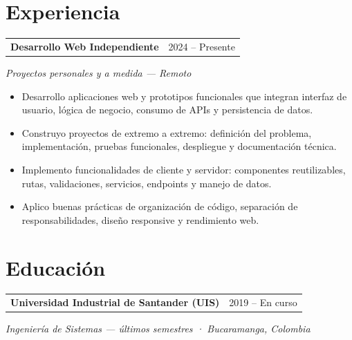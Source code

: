 \documentclass[a4paper,10.5pt]{article}
\makeatletter
\newcommand{\entry}[2]{%
  \noindent\begin{tabularx}{\textwidth}{@{}X@{}r@{}}
    \textbf{#1} & {\color{muted}\small #2}
  \end{tabularx}\par
}
\newcommand{\subentry}[1]{{\color{muted}\itshape #1}\par\vspace{2pt}}
\makeatother
\begin{document}
\section{Experiencia}
\entry{Desarrollo Web Independiente}{2024 -- Presente}
\subentry{Proyectos personales y a medida — Remoto}
\begin{itemize}
  \small
  \item Desarrollo aplicaciones web y prototipos funcionales que integran interfaz de usuario, lógica de negocio, consumo de APIs y persistencia de datos.
  \item Construyo proyectos de extremo a extremo: definición del problema, implementación, pruebas funcionales, despliegue y documentación técnica.
  \item Implemento funcionalidades de cliente y servidor: componentes reutilizables, rutas, validaciones, servicios, endpoints y manejo de datos.
  \item Aplico buenas prácticas de organización de código, separación de responsabilidades, diseño responsive y rendimiento web.
\end{itemize}

\section{Educación}
\entry{Universidad Industrial de Santander (UIS)}{2019 -- En curso}
\subentry{Ingeniería de Sistemas — últimos semestres · Bucaramanga, Colombia}
\end{document}
